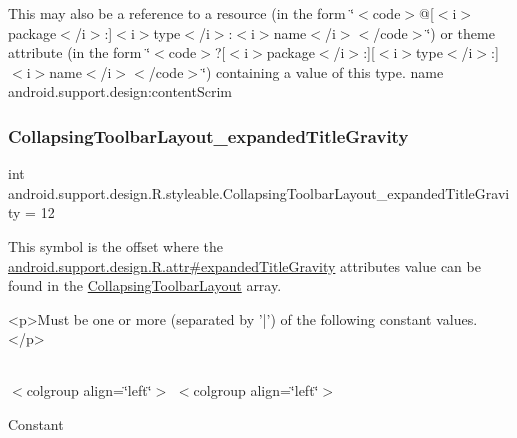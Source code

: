 This may also be a reference to a resource (in the form \char`\"{}$<$code$>$@\mbox{[}$<$i$>$package$<$/i$>$\+:\mbox{]}$<$i$>$type$<$/i$>$\+:$<$i$>$name$<$/i$>$$<$/code$>$\char`\"{}) or theme attribute (in the form \char`\"{}$<$code$>$?\mbox{[}$<$i$>$package$<$/i$>$\+:\mbox{]}\mbox{[}$<$i$>$type$<$/i$>$\+:\mbox{]}$<$i$>$name$<$/i$>$$<$/code$>$\char`\"{}) containing a value of this type.  name android.\+support.\+design\+:content\+Scrim \mbox{\label{classandroid_1_1support_1_1design_1_1R_1_1styleable_a512c33aaaf433f1d80a20c2664d93cc6}} 
\subsubsection{\texorpdfstring{Collapsing\+Toolbar\+Layout\+\_\+expanded\+Title\+Gravity}{CollapsingToolbarLayout\_expandedTitleGravity}}
{\footnotesize\ttfamily int android.\+support.\+design.\+R.\+styleable.\+Collapsing\+Toolbar\+Layout\+\_\+expanded\+Title\+Gravity = 12\hspace{0.3cm}{\ttfamily [static]}}

This symbol is the offset where the \hyperlink{classandroid_1_1support_1_1design_1_1R_1_1attr_a8d74b901cc208373f39160eb9126e754}{android.\+support.\+design.\+R.\+attr\#expanded\+Title\+Gravity} attribute\textquotesingle{}s value can be found in the \hyperlink{classandroid_1_1support_1_1design_1_1R_1_1styleable_a4a019838b1c3daad84b4ffff397db335}{Collapsing\+Toolbar\+Layout} array.

\begin{DoxyVerb}      <p>Must be one or more (separated by '|') of the following constant values.</p>
\end{DoxyVerb}
 \tabulinesep=1mm
\begin{longtabu} spread 0pt [c]{*{0}{|X[-1]}|}
\hline
\end{longtabu}
$<$colgroup align=\char`\"{}left\char`\"{}$>$ $<$colgroup align=\char`\"{}left\char`\"{}$>$ 

Constant

